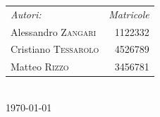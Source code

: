 {\begin{titlepage}
\begin{minipage}{0.4\textwidth}
\begin{flushleft} \large

\begin{tabular}{l r}
	\emph{Autori:} & \emph{Matricole}\\
	Alessandro \textsc{Zangari} & 1122332 \\ %
	Cristiano \textsc{Tessarolo} & 4526789\\ %
	Matteo \textsc{Rizzo} & 3456781 %
\end{tabular}

\end{flushleft}

\end{minipage}\\[2cm]



{\large \today}\\[2cm] %

\vfill %

\end{titlepage}
}
\makeatother